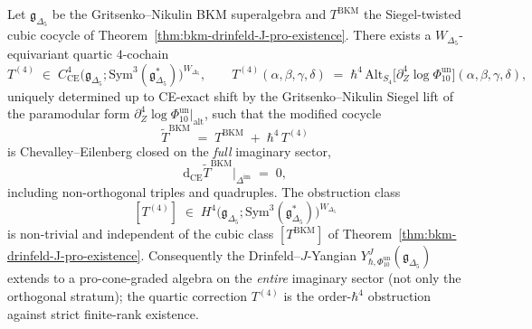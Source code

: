 \begin{theorem}
\label{thm:bkm-drinfeld-J-non-orthogonal-extension}
Let $\mathfrak g_{\Delta_5}$ be the Gritsenko--Nikulin BKM superalgebra and
$T^{\mathrm{BKM}}$ the Siegel-twisted cubic cocycle of
Theorem~\ref{thm:bkm-drinfeld-J-pro-existence}. There exists a
$W_{\Delta_5}$-equivariant quartic $4$-cochain
\[
 T^{(4)}\;\in\;C^4_{\mathrm{CE}}\bigl(\mathfrak g_{\Delta_5};
 \mathrm{Sym}^3(\mathfrak g_{\Delta_5}^*)\bigr)^{W_{\Delta_5}},
 \qquad
 T^{(4)}(\alpha,\beta,\gamma,\delta)
 \;=\;\hbar^4\,\mathrm{Alt}_{S_4}\!\bigl[\partial^4_Z\log\Phi_{10}^{\mathrm{un}}\bigr](\alpha,\beta,\gamma,\delta),
\]
uniquely determined up to CE-exact shift by the Gritsenko--Nikulin
Siegel lift of the paramodular form \(\partial^4_Z\log\Phi_{10}^{\mathrm{un}}|_{\mathrm{alt}}\),
such that the modified cocycle
\[
 \widetilde T^{\mathrm{BKM}}
 \;=\; T^{\mathrm{BKM}}\;+\;\hbar^4\,T^{(4)}
\]
is Chevalley--Eilenberg closed on the \emph{full} imaginary sector,
\[
 \mathrm d_{\mathrm{CE}}\widetilde T^{\mathrm{BKM}}\bigl|_{\Delta^{\mathrm{im}}}
 \;=\;0,
\]
including non-orthogonal triples and quadruples. The obstruction
class
\[
 [T^{(4)}]\;\in\;H^4\bigl(\mathfrak g_{\Delta_5};
 \mathrm{Sym}^3(\mathfrak g_{\Delta_5}^*)\bigr)^{W_{\Delta_5}}
\]
is non-trivial and independent of the cubic class $[T^{\mathrm{BKM}}]$
of Theorem~\ref{thm:bkm-drinfeld-J-pro-existence}.
Consequently the Drinfeld--$J$-Yangian
\(Y^J_{\hbar,\Phi_{10}^{\mathrm{un}}}(\mathfrak g_{\Delta_5})\) extends to a
pro-cone-graded algebra on the \emph{entire} imaginary sector (not
only the orthogonal stratum); the quartic correction $T^{(4)}$ is the
order-$\hbar^4$ obstruction against strict finite-rank existence.
\end{theorem}

